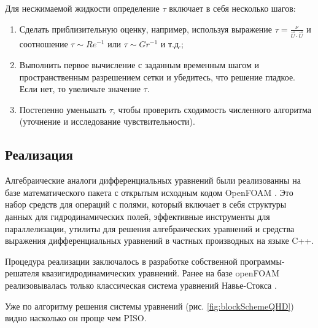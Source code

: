 Для несжимаемой жидкости определение $\tau$ включает в себя несколько шагов:

\begin{enumerate}
     \item Сделать приблизительную оценку, например, используя выражение $\tau = \frac{\nu}{\vec{U} \cdot \vec{U}}$ и соотношение $ \tau \sim Re^{-1} $ или $ \tau \sim Gr^{-1} $ и т.д.;
     \item Выполнить первое вычисление с заданным временным шагом и пространственным разрешением сетки и убедитесь, что решение гладкое. Если нет, то увеличьте значение $\tau $.
     \item Постепенно уменьшать $\tau$, чтобы проверить сходимость численного алгоритма (уточнение и исследование чувствительности).
\end{enumerate} 

\subsection{Реализация}

Алгебраические аналоги дифференциальных уравнений были реализованны на базе математического пакета с открытым исходным кодом OpenFOAM \cite{OpenFOAM}. Это набор средств для операций с полями, который включает в себя структуры данных для гидродинамических полей, эффективные инструменты для параллелизации, утилиты для решения алгебраических уравнений и средства выражения дифференциальных уравнений в частных производных на языке C++. 

Процедура реализации заключалось в разработке собственной программы-решателя квазигидродинамических уравнений. Ранее на базе openFOAM реализовывалась только классическая система уравнений Навье-Стокса \cite{PericCFDLecture}. 

Уже по алгоритму решения системы уравнений (рис. \ref{fig:blockSchemeQHD}) видно насколько он проще чем PISO. 

